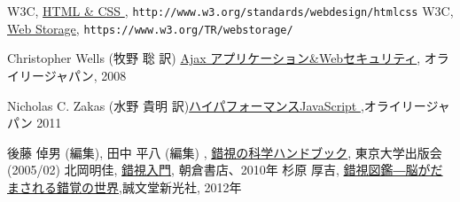 \begin{thebibliography}{99}
 W3C,
				 \href{http://www.w3.org/standards/webdesign/htmlcss}
				 {HTML \& CSS
         }, \texttt{http://www.w3.org/standards/webdesign/htmlcss}
\ifSeminor
\else
 W3C, \href{https://www.w3.org/TR/webstorage/}
				 {Web Storage}, \texttt{https://www.w3.org/TR/webstorage/}
\fi
\iffalse\else
\ifSeminor
\else
 Christopher Wells (牧野 聡  訳)
\href{http://www.amazon.co.jp/Ajaxアプリケーション-Webセキュリティ-Christopher-Wells/dp/487311358X/ref=sr_1_2?ie=UTF8&s=books&qid=1208068747&sr=8-2}
	 {Ajax アプリケーション\&Webセキュリティ}, オライリージャパン, 2008
    \fi
 \fi
 Nicholas C. Zakas (水野 貴明 訳)\href{http://www.amazon.co.jp/%E3%83%8F%E3%82%A4%E3%83%91%E3%83%95%E3%82%A9%E3%83%BC%E3%83%9E%E3%83%B3%E3%82%B9JavaScript-Nicholas-C-Zakas/dp/487311490X/ref=sr_1_1?ie=UTF8&s=books&qid=1304649839&sr=8-1}{ハイパフォーマンスJavaScript },オライリージャパン 2011
				 \iffalse
 \bibitem{JavaScriptMentenable}Nicholas C. Zakas(豊福 剛 訳), 
\href{http://www.amazon.co.jp/%E3%83%A1%E3%83%B3%E3%83%86%E3%83%8A%E3%83%96%E3%83%ABJavaScript-%E2%80%95%E8%AA%AD%E3%81%BF%E3%82%84%E3%81%99%E3%81%8F%E4%BF%9D%E5%AE%88%E3%81%97%E3%82%84%E3%81%99%E3%81%84JavaScript%E3%82%B3%E3%83%BC%E3%83%89%E3%81%AE%E3%81%9F%E3%82%81%E3%81%AE%E4%BD%9C%E6%B3%95-Nicholas-C-Zakas/dp/4873116104/ref=sr_1_1?ie=UTF8&qid=1365330242&sr=8-1&keywords=%E3%83%A1%E3%83%B3%E3%83%86%E3%83%8A%E3%83%96%E3%83%ABJavaScript%E3%80%80}
{メンテナブルJavaScript　読みやすく保守しやすいJavaScriptコー
ドの作法}, オライリー・ジャパン, 2013年
				 \fi
後藤 倬男 (編集), 田中 平八 (編集) , \href{http://www.amazon.co.jp/%E9%8C%AF%E8%A6%96%E3%81%AE%E7%A7%91%E5%AD%A6%E3%83%8F%E3%83%B3%E3%83%89%E3%83%96%E3%83%83%E3%82%AF-%E5%BE%8C%E8%97%A4-%E5%80%AC%E7%94%B7/dp/4130111159/sr=1-3/qid=1167376185/ref=sr_1_3/503-0729601-8062303?ie=UTF8&s=books}
{錯視の科学ハンドブック}, 東京大学出版会 (2005/02)
北岡明佳, 
				\href{http://www.amazon.co.jp/%E9%8C%AF%E8%A6%96%E5%85%A5%E9%96%80-%E5%8C%97%E5%B2%A1-%E6%98%8E%E4%BD%B3/dp/4254102267/ref=sr_1_2?s=books&ie=UTF8&qid=1457334952&sr=1-2&keywords=%E5%8C%97%E5%B2%A1%E6%98%8E%E4%BD%B3}
				{錯視入門}, 朝倉書店、2010年
        \iffalse
 杉原 厚吉,
				\href{http://www.amazon.co.jp/%E9%8C%AF%E8%A6%96%E5%9B%B3%E9%91%91%E2%80%95%E8%84%B3%E3%81%8C%E3%81%A0%E3%81%BE%E3%81%95%E3%82%8C%E3%82%8B%E9%8C%AF%E8%A6%9A%E3%81%AE%E4%B8%96%E7%95%8C-%E6%9D%89%E5%8E%9F-%E5%8E%9A%E5%90%89/dp/4416212658/ref=sr_1_4?s=books&ie=UTF8&qid=1457335216&sr=1-4&keywords=%E9%8C%AF%E8%A6%96}{錯視図鑑―脳がだまされる錯覚の世界},誠文堂新光社, 2012年

\end{thebibliography}
